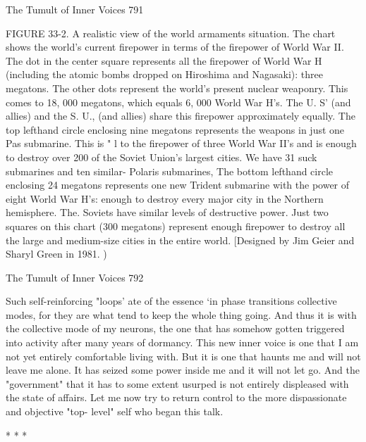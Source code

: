 The Tumult of Inner Voices                                                             791

FIGURE 33-2. A realistic view of the world armaments situation. The chart shows the
world's current firepower in terms of the firepower of World War II. The dot in the
center square represents all the firepower of World War H (including the atomic
bombs dropped on Hiroshima and Nagasaki): three megatons. The other dots
represent the world's present nuclear weaponry. This comes to 18, 000 megatons,
which equals 6, 000 World War H's. The U. S' (and allies) and the S. U., (and allies)
share this firepower approximately equally.
        The top lefthand circle enclosing nine megatons represents the weapons in just
one Pas submarine. This is " l to the firepower of three World War II's and is enough
to destroy over 200 of the Soviet Union's largest cities. We have 31 suck submarines
and ten similar- Polaris submarines, The bottom lefthand circle enclosing 24
megatons represents one new Trident submarine with the power of eight World War
H's: enough to destroy every major city in the Northern hemisphere. The. Soviets have
similar levels of destructive power.
        Just two squares on this chart (300 megatons) represent enough firepower to
destroy all the large and medium-size cities in the entire world. [Designed by Jim
Geier and Sharyl Green in 1981. )




The Tumult of Inner Voices                                                        792

        Such self-reinforcing "loops' ate of the essence `in phase transitions collective
modes, for they are what tend to keep the whole thing going. And thus it is with the
collective mode of my neurons, the one that has somehow gotten triggered into
activity after many years of dormancy. This new inner voice is one that I am not yet
entirely comfortable living with. But it is one that haunts me and will not leave me
alone. It has seized some power inside me and it will not let go. And the
"government" that it has to some extent usurped is not entirely displeased with the
state of affairs.
        Let me now try to return control to the more dispassionate and objective "top-
level" self who began this talk.

                                       *   *   *

